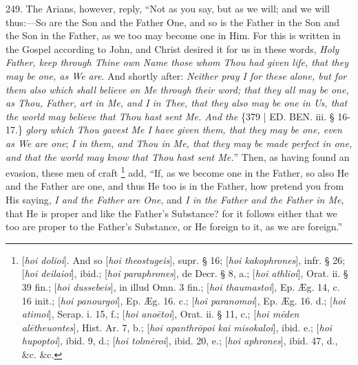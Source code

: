249. The
Arians, however, reply, ``Not as you say, but as we will; and we will
thus:—So are the Son and the Father One, and so is the Father in the
Son and the Son in the Father, as we too may become one in Him. For
this is written in the Gospel according to John, and Christ desired it
for us in these words, \emph{Holy Father, keep through Thine own Name
those whom Thou had given life, that they may be one, as We are}.
And shortly after: \emph{Neither pray I for these alone, but for them
also which shall believe on Me through their word; that they all may
be one, as Thou, Father, art in Me, and I in Thee, that they also may
be one in Us, that the world may believe that Thou hast sent Me. And
the} \{379 | ED.
BEN. iii. § 16-17.\} \emph{glory which Thou gavest
Me I have given them, that they may be one, even as We are one}; \emph{I
in} \emph{them, and Thou in Me, that they may be made perfect in one,
and that the world may know that Thou hast sent Me.}'' Then, as
having found an evasion, these men of craft \footnote{[\emph{hoi dolioi}]. And so [\emph{hoi theostugeis}], supr. § 16; [\emph{hoi
kakophrones}], infr. § 26; [\emph{hoi deilaioi}], ibid.; [\emph{hoi
paraphrones}], de Decr. § 8, a.; [\emph{hoi athlioi}], Orat. ii.
§ 39 fin.; [\emph{hoi dussebeis}], in illud Omn. 3 fin.; [\emph{hoi
thaumastoi}], Ep. Æg. 14, c. 16 init.; [\emph{hoi panourgoi}], Ep.
Æg. 16. c.; [\emph{hoi paranomoi}], Ep. Æg. 16. d.; [\emph{hoi atimoi}],
Serap. i. 15, f.; [\emph{hoi ano\={e}toi}], Orat. ii. § 11, c.; [\emph{hoi
m\={e}den al\={e}theuontes}], Hist. Ar. 7, b.; [\emph{hoi
apanthr\={o}poi kai misokaloi}], ibid. e.; [\emph{hoi hupoptoi}],
ibid. 9, d.; [\emph{hoi tolm\={e}roi}], ibid. 20, e.; [\emph{hoi
aphrones}], ibid. 47, d., \&c. \&c.} add, ``If, as we become one in the Father, so also He and the
Father are one, and thus He too is in the Father, how pretend you from
His saying, \emph{I and the Father are One}, and \emph{I in the Father
and the Father in Me}, that He is proper and like the Father's
Substance? for it follows either that we too are proper to the Father's
Substance, or He foreign to it, as we are foreign.''

